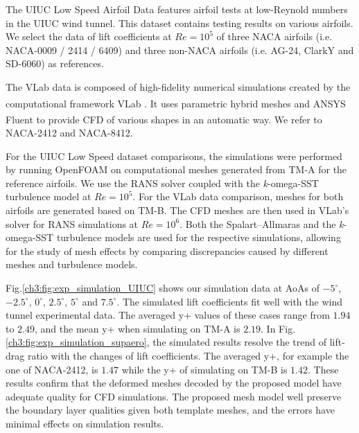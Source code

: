 The UIUC Low Speed Airfoil Data features airfoil tests at low-Reynold numbers in the UIUC wind tunnel. 
This dataset contains testing results on various airfoils.
We select the data of lift coefficients at $Re=10^5$ of three NACA airfoils (i.e. NACA-0009 / 2414 / 6409) and three non-NACA airfoils (i.e. AG-24, ClarkY and SD-6060) as references.

The VLab data is composed of high-fidelity numerical simulations created by the computational framework VLab \cite{aa.Chappin2010,aa.Viola2018}. It uses parametric hybrid meshes and ANSYS\textsuperscript{\textregistered} Fluent\textsuperscript{\textregistered} to provide CFD of various shapes in an automatic way.%
We refer to NACA-2412 and NACA-8412.

For the UIUC Low Speed dataset comparisons, the simulations were performed by running OpenFOAM on computational meshes generated from TM-A for the reference airfoils. We use the RANS solver coupled with the \textit{k}-omega-SST turbulence model \cite{aa.Menter1993} at $Re=10^5$.
For the VLab data comparison, meshes for both airfoils are generated based on TM-B. The CFD meshes are then used in VLab's solver for RANS simulations at $Re=10^6$. Both the Spalart–Allmaras \cite{aa.Spalart1992} and the \textit{k}-omega-SST turbulence models are used for the respective simulations, allowing for the study of mesh effects by comparing discrepancies caused by different meshes and turbulence models.

Fig.\ref{ch3:fig:exp_simulation_UIUC} shows our simulation data at AoAs of $-5^\circ$, $-2.5^\circ$, $0^\circ$, $2.5^\circ$, $5^\circ$ and $7.5^\circ$.
The simulated lift coefficients fit well with the wind tunnel experimental data.
The averaged y+ values of these cases range from $1.94$ to $2.49$, and the mean y+ when simulating on TM-A is $2.19$.
In Fig.\ref{ch3:fig:exp_simulation_supaero}, the simulated results resolve the trend of lift-drag ratio with the changes of lift coefficients.
The averaged y+, for example the one of NACA-2412, is $1.47$ while the y+ of simulating on TM-B is $1.42$.
These results confirm that the deformed meshes decoded by the proposed model have adequate quality for CFD simulations. The proposed mesh model well preserve the boundary layer qualities given both template meshes,  and the errors have minimal effects on simulation results.